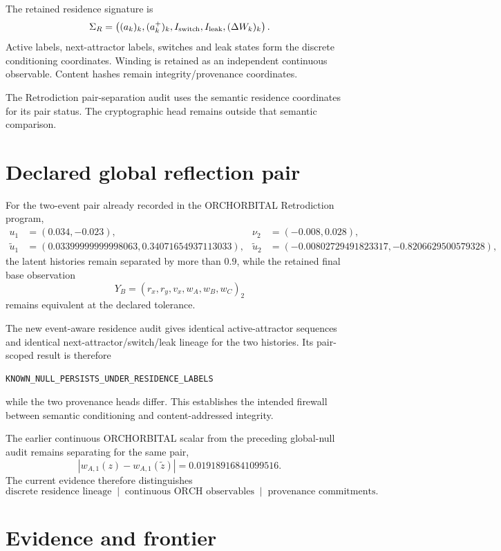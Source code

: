The retained residence signature is
\[
\Sigma_R=
\left(
(a_k)_k,
(a_k^+)_k,
I_{\rm switch},
I_{\rm leak},
(\Delta W_k)_k
\right).
\]
Active labels, next-attractor labels, switches and leak states form the discrete conditioning coordinates. Winding is retained as an independent continuous observable. Content hashes remain integrity/provenance coordinates.

The Retrodiction pair-separation audit uses the semantic residence coordinates for its pair status. The cryptographic head remains outside that semantic comparison.

\section{Declared global reflection pair}

For the two-event pair already recorded in the ORCHORBITAL Retrodiction program,
\[
\begin{aligned}
u_1&=(0.034,-0.023), &
\nu_2&=(-0.008,0.028),\\
\widetilde u_1&=(0.03399999999998063,0.34071654937113033), &
\widetilde u_2&=(-0.00802729491823317,-0.8206629500579328),
\end{aligned}
\]
the latent histories remain separated by more than \(0.9\), while the retained final base observation
\[
Y_B=(r_x,r_y,v_x,w_A,w_B,w_C)_2
\]
remains equivalent at the declared tolerance.

The new event-aware residence audit gives identical active-attractor sequences and identical next-attractor/switch/leak lineage for the two histories. Its pair-scoped result is therefore
\begin{verbatim}
KNOWN_NULL_PERSISTS_UNDER_RESIDENCE_LABELS
\end{verbatim}
while the two provenance heads differ. This establishes the intended firewall between semantic conditioning and content-addressed integrity.

The earlier continuous ORCHORBITAL scalar from the preceding global-null audit remains separating for the same pair,
\[
\boxed{
|w_{A,1}(z)-w_{A,1}(\widetilde z)|
=0.01918916841099516.
}
\]
The current evidence therefore distinguishes
\[
\boxed{
\text{discrete residence lineage}
\;\mid\;
\text{continuous ORCH observables}
\;\mid\;
\text{provenance commitments}.
}
\]

\section{Evidence and frontier}


